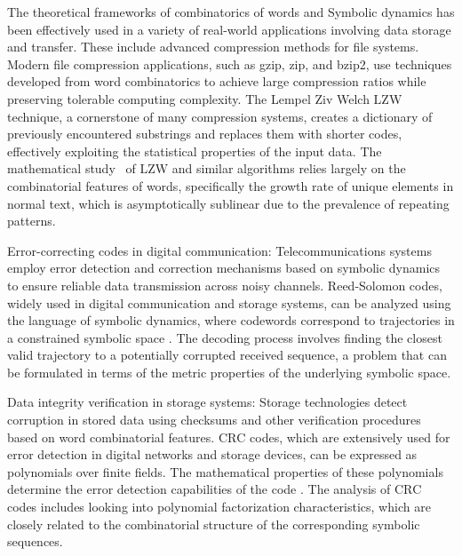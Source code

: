 \documentclass[12pt,a4paper]{article}
\begin{document}
The theoretical frameworks of combinatorics of words and Symbolic dynamics has been effectively used in a variety of real-world applications involving data storage and transfer.  These include advanced compression methods for file systems.  Modern file compression applications, such as gzip, zip, and bzip2, use techniques developed from word combinatorics to achieve large compression ratios while preserving tolerable computing complexity. The Lempel Ziv Welch $\mathrm{LZW}$ technique, a cornerstone of many compression systems, creates a dictionary of previously encountered substrings and replaces them with shorter codes, effectively exploiting the statistical properties of the input data\cite{Welch}. The mathematical study~\cite{LothaireM} of $\mathrm{LZW}$ and similar algorithms relies largely on the combinatorial features of words, specifically the growth rate of unique elements in normal text, which is asymptotically sublinear due to the prevalence of repeating patterns.

Error-correcting codes in digital communication: Telecommunications systems employ error detection and correction mechanisms based on symbolic dynamics to ensure reliable data transmission across noisy channels. Reed-Solomon codes, widely used in digital communication and storage systems, can be analyzed using the language of symbolic dynamics, where codewords correspond to trajectories in a constrained symbolic space \cite{Reed}. The decoding process involves finding the closest valid trajectory to a potentially corrupted received sequence, a problem that can be formulated in terms of the metric properties of the underlying symbolic space.

Data integrity verification in storage systems: Storage technologies detect corruption in stored data using checksums and other verification procedures based on word combinatorial features.  $\mathrm{CRC}$ codes, which are extensively used for error detection in digital networks and storage devices, can be expressed as polynomials over finite fields. The mathematical properties of these polynomials determine the error detection capabilities of the code \cite{Peterson}.  The analysis of $\mathrm{CRC}$ codes includes looking into polynomial factorization characteristics, which are closely related to the combinatorial structure of the corresponding symbolic sequences.
\end{document}
